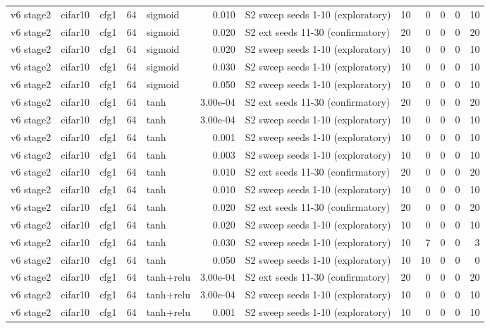\begin{table}[htbp]
{\begin{tabular}{@{}lllrlrlrrrrr@{}}
v6 stage2 & cifar10 & cfg1 & 64 & sigmoid & 0.010 & S2 sweep seeds 1-10 (exploratory) & 10 & 0 & 0 & 0 & 10 \\
v6 stage2 & cifar10 & cfg1 & 64 & sigmoid & 0.020 & S2 ext seeds 11-30 (confirmatory) & 20 & 0 & 0 & 0 & 20 \\
v6 stage2 & cifar10 & cfg1 & 64 & sigmoid & 0.020 & S2 sweep seeds 1-10 (exploratory) & 10 & 0 & 0 & 0 & 10 \\
v6 stage2 & cifar10 & cfg1 & 64 & sigmoid & 0.030 & S2 sweep seeds 1-10 (exploratory) & 10 & 0 & 0 & 0 & 10 \\
v6 stage2 & cifar10 & cfg1 & 64 & sigmoid & 0.050 & S2 sweep seeds 1-10 (exploratory) & 10 & 0 & 0 & 0 & 10 \\
v6 stage2 & cifar10 & cfg1 & 64 & tanh & 3.00e-04 & S2 ext seeds 11-30 (confirmatory) & 20 & 0 & 0 & 0 & 20 \\
v6 stage2 & cifar10 & cfg1 & 64 & tanh & 3.00e-04 & S2 sweep seeds 1-10 (exploratory) & 10 & 0 & 0 & 0 & 10 \\
v6 stage2 & cifar10 & cfg1 & 64 & tanh & 0.001 & S2 sweep seeds 1-10 (exploratory) & 10 & 0 & 0 & 0 & 10 \\
v6 stage2 & cifar10 & cfg1 & 64 & tanh & 0.003 & S2 sweep seeds 1-10 (exploratory) & 10 & 0 & 0 & 0 & 10 \\
v6 stage2 & cifar10 & cfg1 & 64 & tanh & 0.010 & S2 ext seeds 11-30 (confirmatory) & 20 & 0 & 0 & 0 & 20 \\
v6 stage2 & cifar10 & cfg1 & 64 & tanh & 0.010 & S2 sweep seeds 1-10 (exploratory) & 10 & 0 & 0 & 0 & 10 \\
v6 stage2 & cifar10 & cfg1 & 64 & tanh & 0.020 & S2 ext seeds 11-30 (confirmatory) & 20 & 0 & 0 & 0 & 20 \\
v6 stage2 & cifar10 & cfg1 & 64 & tanh & 0.020 & S2 sweep seeds 1-10 (exploratory) & 10 & 0 & 0 & 0 & 10 \\
v6 stage2 & cifar10 & cfg1 & 64 & tanh & 0.030 & S2 sweep seeds 1-10 (exploratory) & 10 & 7 & 0 & 0 & 3 \\
v6 stage2 & cifar10 & cfg1 & 64 & tanh & 0.050 & S2 sweep seeds 1-10 (exploratory) & 10 & 10 & 0 & 0 & 0 \\
v6 stage2 & cifar10 & cfg1 & 64 & tanh+relu & 3.00e-04 & S2 ext seeds 11-30 (confirmatory) & 20 & 0 & 0 & 0 & 20 \\
v6 stage2 & cifar10 & cfg1 & 64 & tanh+relu & 3.00e-04 & S2 sweep seeds 1-10 (exploratory) & 10 & 0 & 0 & 0 & 10 \\
v6 stage2 & cifar10 & cfg1 & 64 & tanh+relu & 0.001 & S2 sweep seeds 1-10 (exploratory) & 10 & 0 & 0 & 0 & 10 \\

\end{tabular}}
\end{table}

